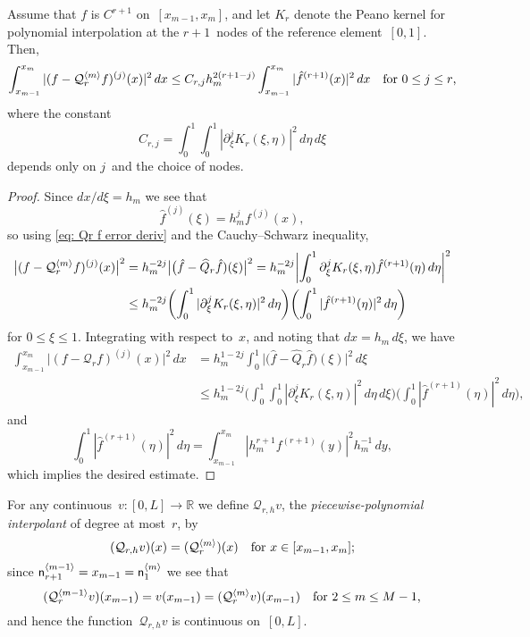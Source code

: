\begin{theorem}
Assume that $f$ is $C^{r+1}$ on~$[x_{m-1},x_m]$, and let $K_r$ denote the Peano 
kernel for polynomial interpolation at the $r+1$~nodes of the reference 
element~$[0,1]$.  Then,
\[
\int_{x_{m-1}}^{x_m}|(f-\mathcal{Q}_r^{\langle m\rangle}f)^{(j)}(x)|^2\,dx
    \le C_{r,j}h_m^{2(r+1-j)}\int_{x_{m-1}}^{x_m}|\hat f^{(r+1)}(x)|^2\,dx
    \quad\text{for $0\le j\le r$,}
\]
where the constant
\[
C_{r,j}=\int_0^1\int_0^1|\partial_\xi^jK_r(\xi,\eta)|^2\,d\eta\,d\xi
\]
depends only on $j$~and the choice of nodes.
\end{theorem}
\begin{proof}
Since $dx/d\xi=h_m$ we see that
\[
\hat f^{(j)}(\xi)=h_m^j f^{(j)}(x),
\]
so using \eqref{eq: Qr f error deriv} and the Cauchy--Schwarz inequality,
\begin{align*}
\bigl|(f-\mathcal{Q}_r^{\langle m\rangle}f)^{(j)}(x)\bigr|^2
    &=h_m^{-2j}\bigl|\bigl(\hat f-\widehat{Q}_r\hat f)(\xi)\bigr|^2
    =h_m^{-2j}\biggl|\int_0^1\partial_\xi^j K_r(\xi,\eta)
        \hat f^{(r+1)}(\eta)\, d\eta\biggr|^2\\
    &\le h_m^{-2j}\biggl(\int_0^1|\partial_\xi^jK_r(\xi,\eta)|^2\,d\eta\biggr)
    \biggl(\int_0^1|\hat f^{(r+1)}(\eta)|^2\,d\eta\biggr)
\end{align*}
for $0\le\xi\le1$.  Integrating with respect to~$x$, and noting that 
$dx=h_m\,d\xi$, we have
\begin{align*}
\int_{x_{m-1}}^{x_m}\bigl|(f-\mathcal{Q}_rf)^{(j)}(x)\bigr|^2\,dx
&=h_m^{1-2j}\int_0^1\bigl|\bigl(\hat f-\widehat{Q}_r\hat f)(\xi)\bigr|^2\,d\xi\\
&\le h_m^{1-2j}\biggl(
    \int_0^1\int_0^1|\partial_\xi^jK_r(\xi,\eta)|^2\,d\eta\,d\xi\biggr)
    \biggl(\int_0^1|\hat f^{(r+1)}(\eta)|^2\,d\eta\biggr),
\end{align*}
and 
\[
\int_0^1|\hat f^{(r+1)}(\eta)|^2\,d\eta=\int_{x_{m-1}}^{x_m}
    |h_m^{r+1}f^{(r+1)}(y)|^2h_m^{-1}\,dy,
\]
which implies the desired estimate.
\end{proof}

For any continuous~$v:[0,L]\to\mathbb{R}$ we define $\mathcal{Q}_{r,h}v$, the 
\emph{piecewise-polynomial interpolant} of degree at most~$r$, by
\[
(\mathcal{Q}_{r,h}v)(x)
    =(\mathcal{Q}_r^{\langle m\rangle})(x)\quad\text{for $x\in[x_{m-1},x_m]$;}
\]
since $\mathsf{n}^{\langle m-1\rangle}_{r+1}=x_{m-1}=\mathsf{n}^{\langle m\rangle}_1$ we see 
that
\[
(\mathcal{Q}_r^{\langle m-1\rangle}v)(x_{m-1})=v(x_{m-1})
    =(\mathcal{Q}_r^{\langle m\rangle}v)(x_{m-1})\quad\text{for~$2\le m\le M-1$,}
\]
and hence the function~$\mathcal{Q}_{r,h}v$ is continuous on~$[0,L]$.

